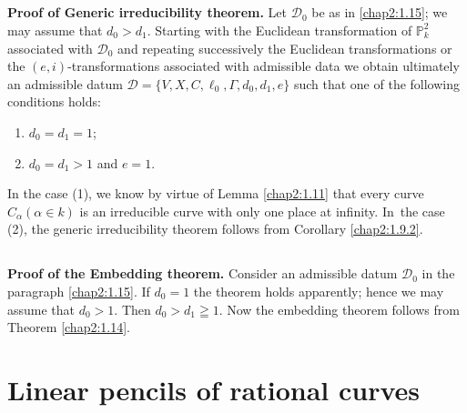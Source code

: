 \subsection{}\label{chap2:1.16}
\noindent \textbf{Proof of Generic irreducibility theorem.} 
Let $\mathscr{D}_{0}$ be as in \ref{chap2:1.15}; we may assume that
$d_{0}>d_{1}$. Starting with the Euclidean transformation of
$\mathbb{P}^{2}_{k}$ associated with $\mathscr{D}_{0}$ and repeating
successively the Euclidean transformations or the
$(e,i)$-transformations associated with admissible data we obtain
ultimately an admissible datum
$\mathscr{D}=\{V,X,C,\ell_{0},\Gamma,d_{0},d_{1},e\}$ such that one of
the following conditions holds:
\begin{enumerate}
\renewcommand{\labelenumi}{(\theenumi)}
\item $d_{0}=d_{1}=1$; 

\item $d_{0}=d_{1}>1$ and $e=1$.
\end{enumerate}
In the case (1), we know by virtue of Lemma \ref{chap2:1.11} that every
curve $C_{\alpha}(\alpha\in k)$ is an irreducible curve with only one
place at infinity. In\pageoriginale\ the case (2), the generic
irreducibility theorem follows from Corollary \ref{chap2:1.9.2}.

\subsection{}\label{chap2:1.17}
\noindent \textbf{Proof of the Embedding theorem.} 
Consider an admissible datum $\mathscr{D}_{0}$ in the paragraph
\ref{chap2:1.15}. If $d_{0}=1$ the theorem holds apparently; hence we may
assume that $d_{0}>1$. Then $d_{0}>d_{1}\geqq 1$. Now the embedding
theorem follows from Theorem \ref{chap2:1.14}.

\section{Linear pencils of rational curves}\label{chap2:sec2}\pageoriginale\

